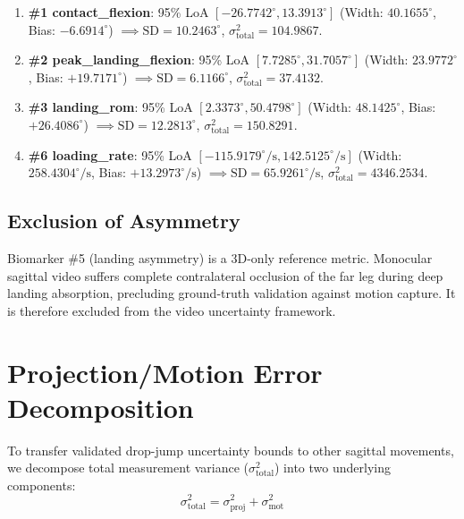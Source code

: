 \begin{enumerate}
  \item \textbf{\protect\#1 contact\_flexion}: 95\% LoA $[-26.7742^\circ, 13.3913^\circ]$ (Width: $40.1655^\circ$, Bias: $-6.6914^\circ$) $\implies \text{SD} = 10.2463^\circ$, $\sigma^2_{\text{total}} = \mathbf{104.9867}$.
  \item \textbf{\protect\#2 peak\_landing\_flexion}: 95\% LoA $[7.7285^\circ, 31.7057^\circ]$ (Width: $23.9772^\circ$, Bias: $+19.7171^\circ$) $\implies \text{SD} = 6.1166^\circ$, $\sigma^2_{\text{total}} = \mathbf{37.4132}$.
  \item \textbf{\protect\#3 landing\_rom}: 95\% LoA $[2.3373^\circ, 50.4798^\circ]$ (Width: $48.1425^\circ$, Bias: $+26.4086^\circ$) $\implies \text{SD} = 12.2813^\circ$, $\sigma^2_{\text{total}} = \mathbf{150.8291}$.
  \item \textbf{\protect\#6 loading\_rate}: 95\% LoA $[-115.9179^\circ/\text{s}, 142.5125^\circ/\text{s}]$ (Width: $258.4304^\circ/\text{s}$, Bias: $+13.2973^\circ/\text{s}$) $\implies \text{SD} = 65.9261^\circ/\text{s}$, $\sigma^2_{\text{total}} = \mathbf{4346.2534}$.
\end{enumerate}

\subsection{Exclusion of Asymmetry}
\label{sec:8-2-2-exclusion-of-asymmetry}

Biomarker \protect\#5 (landing asymmetry) is a 3D-only reference metric. Monocular sagittal video suffers complete contralateral occlusion of the far leg during deep landing absorption, precluding ground-truth validation against motion capture. It is therefore excluded from the video uncertainty framework.



\section{Projection/Motion Error Decomposition}
\label{sec:8-3-projection-motion-error-decomposition}


To transfer validated drop-jump uncertainty bounds to other sagittal movements, we decompose total measurement variance ($\sigma^2_{\text{total}}$) into two underlying components:
\begin{equation}
  \sigma^2_{\text{total}} = \sigma^2_{\text{proj}} + \sigma^2_{\text{mot}}
  \label{eq:disp1}
\end{equation}

